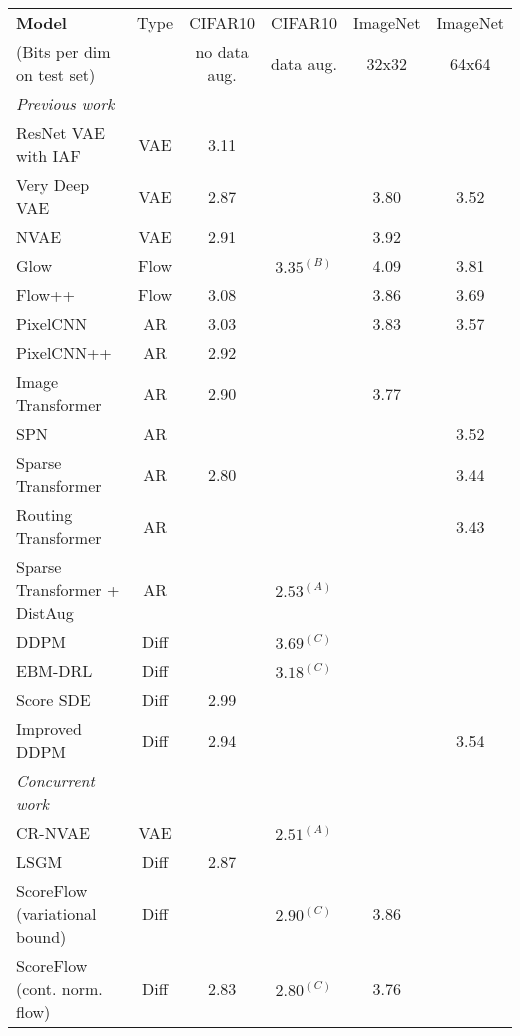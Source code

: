 \documentclass{article}
\begin{document}
\begin{table}[t]
\footnotesize
\begin{center}
\setlength{\tabcolsep}{4pt}
\begin{tabular}{lccccc}
\textbf{Model} & Type & CIFAR10 & CIFAR10 & ImageNet & ImageNet \\
(Bits per dim on test set)&  & no data aug. & data aug. & 32x32 & 64x64\\
\midrule
\textit{Previous work}\\
ResNet VAE with IAF~\citep{kingma2016improving} & VAE & 3.11 & \\
Very Deep VAE~\citep{child2020very} & VAE & 2.87 & & 3.80 & 3.52 \\
NVAE~\citep{vahdat2020nvae} & VAE & 2.91 & & 3.92 & \\
Glow~\citep{kingma2018glow} & Flow & & $3.35^{(B)}$ & 4.09 & 3.81 \\
Flow++~\citep{ho2019flow++} & Flow & 3.08 & & 3.86 & 3.69 \\
PixelCNN~\citep{van2016pixel} & AR & 3.03 & & 3.83 & 3.57\\
PixelCNN++~\citep{salimans2017pixelcnn++} & AR & 2.92 &\\
Image Transformer~\citep{parmar2018image} & AR & 2.90 & & 3.77\\
SPN ~\citep{menick2018generating} & AR & & & & 3.52 \\
Sparse Transformer~\citep{child2019generating}& AR &2.80 & & & 3.44 \\
Routing Transformer~\citep{roy2021efficient} & AR & & & & 3.43\\
Sparse Transformer + DistAug~\citep{jun2020distribution} & AR & & $2.53^{(A)}$ & & \\
DDPM~\citep{ho2020denoising} & Diff & & $3.69^{(C)}$ & & \\
EBM-DRL~\citep{gao2020learning} & Diff & & $3.18^{(C)}$ & & \\
Score SDE~\citep{song2020score} & Diff & 2.99 & & & \\
Improved DDPM~\citep{nichol2021improved} & Diff & 2.94 & & & 3.54 \\
\midrule
\textit{Concurrent work}\\
CR-NVAE \citep{sinha2021consistency} & VAE & & $2.51^{(A)}$ \\ 
LSGM~\citep{vahdat2021score} & Diff & 2.87\\
ScoreFlow~\citep{song2021maximum} (variational bound) & Diff & & $2.90^{(C)}$ & 3.86 & \\
ScoreFlow~\citep{song2021maximum} (cont. norm. flow) & Diff & 2.83 & $2.80^{(C)}$ & 3.76 & \\

\end{tabular}
\end{center}
\end{table}
\end{document}

